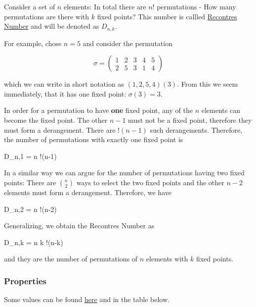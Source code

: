 
Consider a set of $n$ elements: In total there are $n!$ permutations - How many permutations are there with $k$ fixed points? This number is callled \href{https://en.wikipedia.org/wiki/Rencontres_numbers}{Recontres Number} and will be denoted as $D_{n,k}$.

For example, chose $n=5$ and consider the permutation

\[
\sigma=\begin{pmatrix}
1 & 2 & 3 & 4 & 5 \\
2 & 5 & 3 & 1 & 4
\end{pmatrix}
\]

which we can write in short notation as $(1,2,5,4)(3)$. From this we seem immediately, that it has one fixed point: $\sigma(3) = 3$.

In order for a permutation to have \textbf{one} fixed point, any of the $n$ elements can become the fixed point. The other $n-1$ must not be a fixed point, therefore they must form a derangement. There are $!(n-1)$ such derangements. Therefore, the number of permutations with exactly one fixed point is

\bee
D_{n,1} = n !(n-1)
\eee

In a similar way we can argue for the number of permutations having two fixed points: There are $n \choose 2$ ways to select the two fixed points and the other $n-2$ elements must form a derangement. Therefore, we have

\bee
D_{n,2} = {n } !(n-2)
\eee

Generalizing, we obtain the Recontres Number as

\be\label{2016-01-04:eq1}
D_{n,k} = {n \choose k} !(n-k)
\ee

and they are the number of permutations of $n$ elements with $k$ fixed points.

\subsubsection{Properties}

Some values can be found \href{https://en.wikipedia.org/wiki/Rencontres_numbers}{here} and in the table below.



